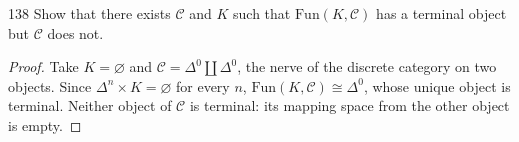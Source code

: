 \begin{exercise}{138}
Show that there exists $\mathcal C$ and $K$ such that $\mathrm{Fun}(K,\mathcal C)$ has a terminal object but
$\mathcal C$ does not.

\begin{proof}
Take $K=\varnothing$ and $\mathcal C=\Delta^0\amalg\Delta^0$, the nerve
of the discrete category on two objects.
Since $\Delta^n\times K=\varnothing$ for every $n$,
$\mathrm{Fun}(K,\mathcal C)\cong\Delta^0$, whose unique object is terminal.
Neither object of $\mathcal C$ is terminal: its mapping space from
the other object is empty.
\end{proof}
\end{exercise}
